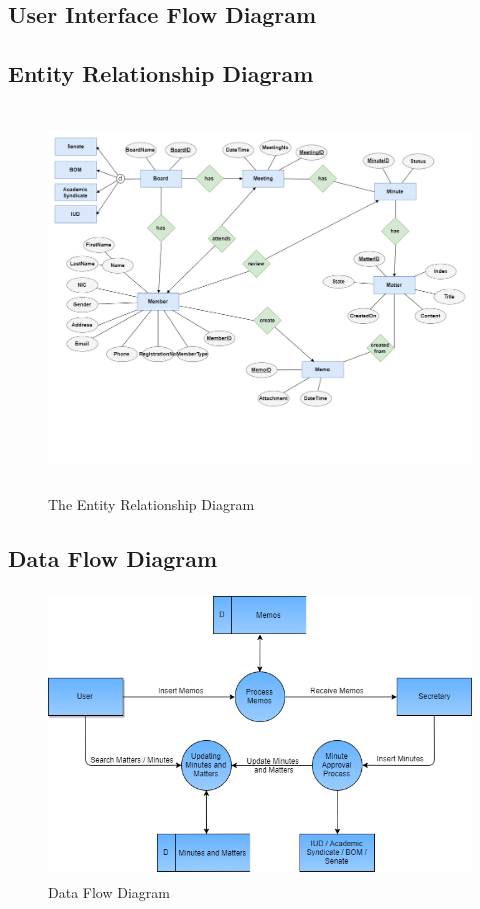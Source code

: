 \documentclass[a4paper,beamer]{article}
\begin{document}
	\subsection{User Interface Flow Diagram}
	
	\newpage
	\subsection{Entity Relationship Diagram}
	
	\begin{figure}[h]
		\begin{center}
			\includegraphics[width=6in,height=4in]{img/entity-relationship-diagram}
		\end{center}
		\caption{The Entity Relationship Diagram}
		\label{fig:ERD}
	\end{figure}
	\newpage  
	
	\subsection{Data Flow Diagram}
	
	\begin{figure}[h]
		\begin{center}
			\includegraphics[width=5in,height=3in]{img/data-flow-diagram}
		\end{center}
		\caption{Data Flow Diagram}
		\label{fig:dataflow}
	\end{figure}
	\newpage  
	
\end{document}
